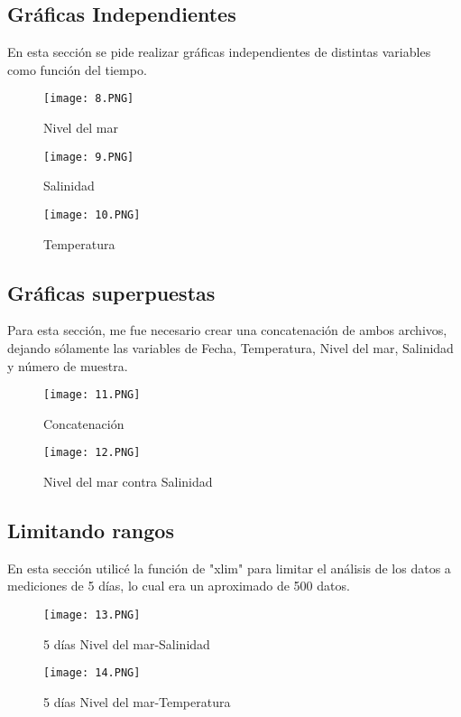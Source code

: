 \documentclass{article}
\begin{document}
\subsection{Gráficas Independientes}
En esta sección se pide realizar gráficas independientes de distintas variables como función del tiempo.
\begin{figure}[H]
\texttt{[image: 8.PNG]}
\caption{Nivel del mar}
\end{figure}
\begin{figure}[H]
\texttt{[image: 9.PNG]}
\caption{Salinidad}
\end{figure}
\begin{figure}[H]
\texttt{[image: 10.PNG]}
\caption{Temperatura}
\end{figure}
\subsection{Gráficas superpuestas}
Para esta sección, me fue necesario crear una concatenación de ambos archivos, dejando sólamente las variables de Fecha, Temperatura, Nivel del mar, Salinidad y número de muestra.
\begin{figure}[H]
\texttt{[image: 11.PNG]}
\caption{Concatenación}
\end{figure}
\begin{figure}[H]
\texttt{[image: 12.PNG]}
\caption{Nivel del mar contra Salinidad}
\end{figure}
\subsection{Limitando rangos}
En esta sección utilicé la función de "xlim" para limitar el análisis de los datos a mediciones de 5 días, lo cual era un aproximado de 500 datos.
\begin{figure}[H]
\texttt{[image: 13.PNG]}
\caption{5 días Nivel del mar-Salinidad}
\end{figure}
\begin{figure}[H]
\texttt{[image: 14.PNG]}
\caption{5 días Nivel del mar-Temperatura}
\end{figure}
\end{document}
